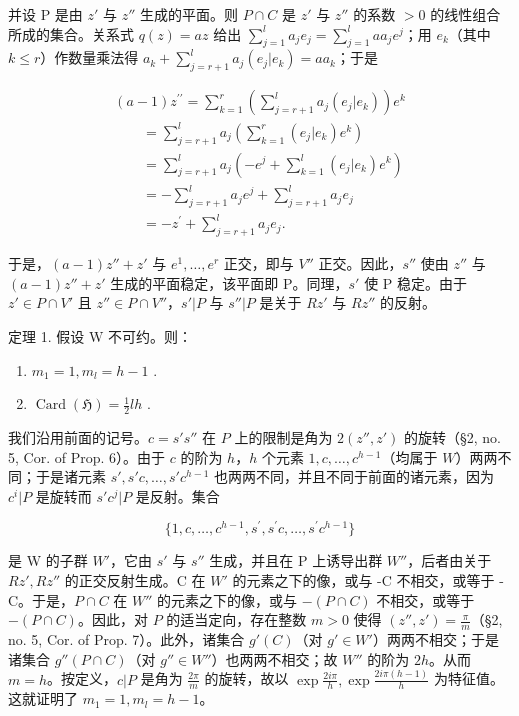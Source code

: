 并设 P 是由 \(z'\) 与 \(z''\) 生成的平面。则 \(P \cap C\) 是 \(z'\) 与 \(z''\) 的系数 \(> 0\) 的线性组合所成的集合。关系式 \(q(z) = az\) 给出 \(\sum_{j=1}^{l} a_j e_j = \sum_{j=1}^{l} aa_j e^j\)；用 \(e_k\)（其中 \(k \leqslant r\)）作数量乘法得 \(a_k + \sum_{j=r+1}^{l} a_j (e_j | e_k) = aa_k\)；于是

\[
\begin{array}{l} (a - 1) z ^ {\prime \prime} = \sum_ {k = 1} ^ {r} \left(\sum_ {j = r + 1} ^ {l} a _ {j} (e _ {j} | e _ {k})\right) e ^ {k} \\ \qquad = \sum_ {j = r + 1} ^ {l} a _ {j} \left(\sum_ {k = 1} ^ {r} (e _ {j} | e _ {k}) e ^ {k}\right) \\ \qquad = \sum_ {j = r + 1} ^ {l} a _ {j} \left(- e ^ {j} + \sum_ {k = 1} ^ {l} (e _ {j} | e _ {k}) e ^ {k}\right) \\ \qquad = - \sum_ {j = r + 1} ^ {l} a _ {j} e ^ {j} + \sum_ {j = r + 1} ^ {l} a _ {j} e _ {j} \\ \qquad = - z ^ {\prime} + \sum_ {j = r + 1} ^ {l} a _ {j} e _ {j}. \end{array}
\]

于是，\((a-1)z'' + z'\) 与 \(e^{1}, \ldots, e^{r}\) 正交，即与 \(V''\) 正交。因此，\(s''\) 使由 \(z''\) 与 \((a-1)z'' + z'\) 生成的平面稳定，该平面即 P。同理，\(s'\) 使 P 稳定。由于 \(z' \in P \cap V'\) 且 \(z'' \in P \cap V''\)，\(s'|P\) 与 \(s''|P\) 是关于 \(Rz'\) 与 \(Rz''\) 的反射。

定理 1. 假设 W 不可约。则：

\begin{enumerate}
\def\labelenumi{(\roman{enumi})}
\item
  \(m_{1} = 1, m_{l} = h - 1\) .
\item
  \(\operatorname{Card}(\mathfrak{H}) = \frac{1}{2} lh\) .
\end{enumerate}

我们沿用前面的记号。\(c = s's''\) 在 \(P\) 上的限制是角为 \(2(z'', z')\) 的旋转（§2, no. 5, Cor. of Prop. 6）。由于 \(c\) 的阶为 \(h\)，\(h\) 个元素 \(1, c, \ldots, c^{h-1}\)（均属于 \(W\)）两两不同；于是诸元素 \(s', s'c, \ldots, s'c^{h-1}\) 也两两不同，并且不同于前面的诸元素，因为 \(c^i |P\) 是旋转而 \(s'c^j |P\) 是反射。集合

\[
\{1, c, \dots , c ^ {h - 1}, s ^ {\prime}, s ^ {\prime} c, \dots , s ^ {\prime} c ^ {h - 1} \}
\]

是 W 的子群 \(W'\)，它由 \(s'\) 与 \(s''\) 生成，并且在 P 上诱导出群 \(W''\)，后者由关于 \(Rz', Rz''\) 的正交反射生成。C 在 \(W'\) 的元素之下的像，或与 -C 不相交，或等于 -C。于是，\(P \cap C\) 在 \(W''\) 的元素之下的像，或与 \(-(P \cap C)\) 不相交，或等于 \(-(P \cap C)\)。因此，对 \(P\) 的适当定向，存在整数 \(m > 0\) 使得 \((z'', z') = \frac{\pi}{m}\)（§2, no. 5, Cor. of Prop. 7）。此外，诸集合 \(g'(C)\)（对 \(g' \in W'\)）两两不相交；于是诸集合 \(g''(P \cap C)\)（对 \(g'' \in W''\)）也两两不相交；故 \(W''\) 的阶为 \(2h\)。从而 \(m = h\)。按定义，\(c|P\) 是角为 \(\frac{2\pi}{m}\) 的旋转，故以 \(\exp \frac{2i\pi}{h}, \exp \frac{2i\pi(h - 1)}{h}\) 为特征值。这就证明了 \(m_1 = 1, m_l = h - 1\)。

